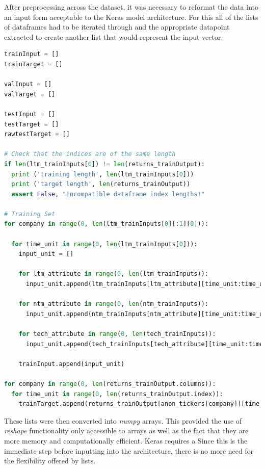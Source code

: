 \documentclass[10pt,onecolumn,letterpaper]{article}
\begin{document}
After preprocessing across the dataset, it was necessary to reformat the data into an input form acceptable to the Keras model architecture. For this all of the lists of dataframes had to be iterated through and the appropriate datapoint extracted to create another list that would represent the input vector. 

\begin{lstlisting}[language=Python, breaklines=true]
trainInput = []
trainTarget = []

valInput = []
valTarget = []

testInput = []
testTarget = []
rawtestTarget = []

# Check that the indices are of the same length 
if len(ltm_trainInputs[0]) != len(returns_trainOutput):
  print ('training length', len(ltm_trainInputs[0]))
  print ('target length', len(returns_trainOutput))
  assert False, "Incompatible dataframe index lengths!"

# Training Set
for company in range(0, len(ltm_trainInputs[0][:1][0])):
  
  for time_unit in range(0, len(ltm_trainInputs[0])): 
    input_unit = []
    
    for ltm_attribute in range(0, len(ltm_trainInputs)): 
      input_unit.append(ltm_trainInputs[ltm_attribute][time_unit:time_unit+1][0][company])
                        
    for ntm_attribute in range(0, len(ntm_trainInputs)):
      input_unit.append(ntm_trainInputs[ntm_attribute][time_unit:time_unit+1][0][company])
                        
    for tech_attribute in range(0, len(tech_trainInputs)): 
      input_unit.append(tech_trainInputs[tech_attribute][time_unit:time_unit+1][0][company])
                        
    trainInput.append(input_unit)
    
for company in range(0, len(returns_trainOutput.columns)):
  for time_unit in range(0, len(returns_trainOutput.index)): 
    trainTarget.append(returns_trainOutput[anon_tickers[company]][time_unit])
\end{lstlisting} 

These lists were then converted into \textit{numpy} arrays. This provided the use of \textit{reshape} functionality only accessible to arrays as well as the fact that they are more memory and computationally efficient. Keras requires a Since this is the immediate step before inputting into the architecture, there is no more need for the flexibility offered by lists. 
\end{document}
